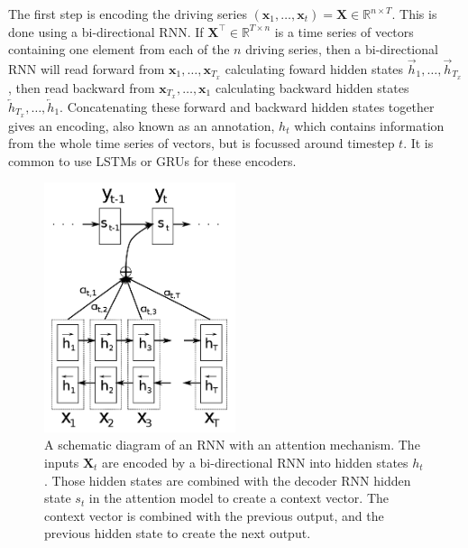 \documentclass[a4paper,12pt]{article}
\theoremstyle{definition}
\begin{document}
The first step is encoding the driving series $(\mathbf{x}_1, \dots, \mathbf{x}_t) = \mathbf{X} \in \mathbb{R}^{n \times T}$. This is done using a bi-directional RNN. If $\mathbf{X}^{\top} \in \mathbb{R}^{T \times n}$ is a time series of vectors containing one element from each of the $n$ driving series, then a bi-directional RNN will read forward from $\mathbf{x}_1, \dots,\mathbf{x}_{T_x}$ calculating foward hidden states $\overrightarrow{h}_1, \dots, \overrightarrow{h}_{T_x}$, then read backward from $\mathbf{x}_{T_x}, \dots,\mathbf{x}_1$ calculating backward hidden states $\overleftarrow{h}_{T_x}, \dots, \overleftarrow{h}_1$. Concatenating these forward and backward hidden states together gives an encoding, also known as an annotation, $h_{t}$ which contains information from the whole time series of vectors, but is focussed around timestep $t$. It is common to use LSTMs or GRUs for these encoders. 

\begin{figure}[ht]
	\centering
	\includegraphics[width=0.5\textwidth]{figures/attention_mechanism.png}
	\caption{A schematic diagram of an RNN with an attention mechanism. The inputs $\mathbf{X}_t$ are encoded by a bi-directional RNN into hidden states $h_t$. Those hidden states are combined with the decoder RNN hidden state $s_t$ in the attention model to create a context vector. The context vector is combined with the previous output, and the previous hidden state to create the next output.}
	\label{fig:attention_mechanism}
\end{figure}
\end{document}
